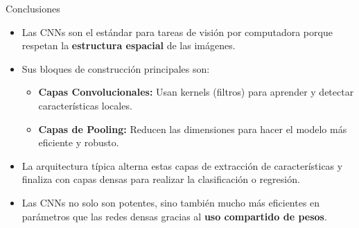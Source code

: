 \documentclass[aspectratio=169, 10pt]{beamer}
\begin{document}
\begin{frame}{Conclusiones}
	\begin{itemize}
		\item Las CNNs son el estándar para tareas de visión por computadora porque respetan la \textbf{estructura espacial} de las imágenes.
		\item Sus bloques de construcción principales son:
		\begin{itemize}
			\item \textbf{Capas Convolucionales:} Usan kernels (filtros) para aprender y detectar características locales.
			\item \textbf{Capas de Pooling:} Reducen las dimensiones para hacer el modelo más eficiente y robusto.
		\end{itemize}
		\item La arquitectura típica alterna estas capas de extracción de características y finaliza con capas densas para realizar la clasificación o regresión.
		\item Las CNNs no solo son potentes, sino también mucho más eficientes en parámetros que las redes densas gracias al \textbf{uso compartido de pesos}.
	\end{itemize}
\end{frame}
\end{document}
